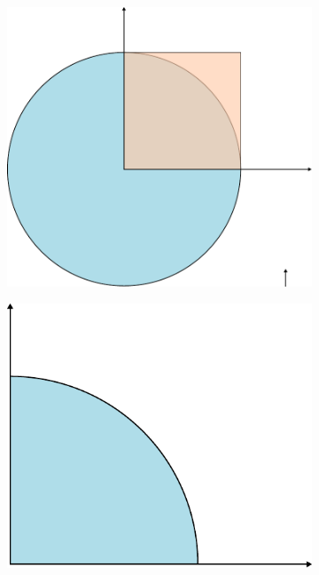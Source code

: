 \documentclass[11pt,a4paper]{article}
\begin{document}
\begin{itemize}
\begin{itemize}
        \begin{figure}
            \centering
            \begin{subfigure}[b]{0.24\textwidth}
                \includegraphics[width=\textwidth]{figures/SD.pdf}
                \caption{}\label{fig:SD}
            \end{subfigure}
            \begin{subfigure}[b]{0.24\textwidth}
                \includegraphics[width=\textwidth]{figures/intersection.pdf}

\end{subfigure}
\end{figure}
\end{itemize}
\end{itemize}
\end{document}
